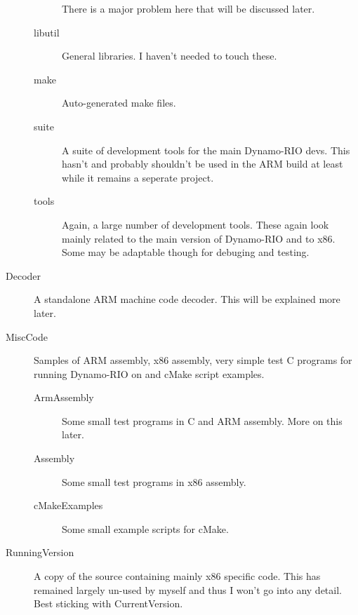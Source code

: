 \documentclass[a4paper]{article}
\begin{document}
\begin{description}
\begin{description}
	There is a major problem here that will be discussed later.
	\item[libutil] General libraries. I haven't needed to touch these.
	\item[make] Auto-generated make files.
	\item[suite] A suite of development tools for the main Dynamo-RIO devs. This
	hasn't and probably shouldn't be used in the ARM build at least while it remains
	a seperate project.
	\item[tools] Again, a large number of development tools. These again look mainly
	related to the main version of Dynamo-RIO and to x86. Some may be adaptable
	though for debuging and testing.
	\end{description}
\item[Decoder] A standalone ARM machine code decoder. This will be explained
more later.
\item[MiscCode] Samples of ARM assembly, x86 assembly, very simple test C
programs for running Dynamo-RIO on and cMake script examples.
\begin{description}
	\item[ArmAssembly] Some small test programs in C and ARM assembly. More on
	this later.
	\item[Assembly] Some small test programs in x86 assembly.
	\item[cMakeExamples] Some small example scripts for cMake.
\end{description}
\item[RunningVersion] A copy of the source containing mainly x86 specific code.
This has remained largely un-used by myself and thus I won't go into any detail.
Best sticking with CurrentVersion.
\end{description}
\end{document}
